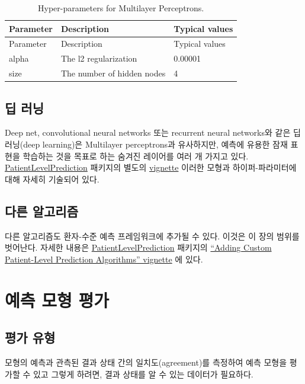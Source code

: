 \documentclass[11pt]{book}
\theoremstyle{definition}
\theoremstyle{definition}
\theoremstyle{definition}
\theoremstyle{remark}
\begin{document}
\begin{longtable}[]{@{}lll@{}}
\caption{\label{tab:mpParameters} Hyper-parameters for Multilayer
Perceptrons.}\tabularnewline
\toprule
Parameter & Description & Typical values\tabularnewline
\midrule
\endfirsthead
\toprule
Parameter & Description & Typical values\tabularnewline
\midrule
\endhead
alpha & The l2 regularization & 0.00001\tabularnewline
size & The number of hidden nodes & 4\tabularnewline
\bottomrule
\end{longtable}

\subsection{딥 러닝}\label{-}

Deep net, convolutional neural networks 또는 recurrent neural networks와
같은 딥 러닝(deep learning)은 Multilayer perceptrons과 유사하지만,
예측에 유용한 잠재 표현을 학습하는 것을 목표로 하는 숨겨진 레이어를 여러
개 가지고 있다.
\href{https://ohdsi.github.io/PatientLevelPrediction/}{PatientLevelPrediction}
패키지의 별도의
\href{https://ohdsi.github.io/PatientLevelPrediction/articles/BuildingDeepLearningModels.html}{vignette}
이러한 모형과 하이퍼-파라미터에 대해 자세히 기술되어
있다. 

\subsection{다른 알고리즘}\label{-}

다른 알고리즘도 환자-수준 예측 프레임워크에 추가될 수 있다. 이것은 이
장의 범위를 벗어난다. 자세한 내용은
\href{https://ohdsi.github.io/PatientLevelPrediction/}{PatientLevelPrediction}
패키지의
\href{https://ohdsi.github.io/PatientLevelPrediction/articles/AddingCustomAlgorithms.html}{``Adding
Custom Patient-Level Prediction Algorithms'' vignette} 에 있다.

\section{예측 모형 평가}\label{--}

\subsection{평가 유형}\label{-}

모형의 예측과 관측된 결과 상태 간의 일치도(agreement)를 측정하여 예측
모형을 평가할 수 있고 그렇게 하려면, 결과 상태를 알 수 있는 데이터가
필요하다. 
\end{document}
